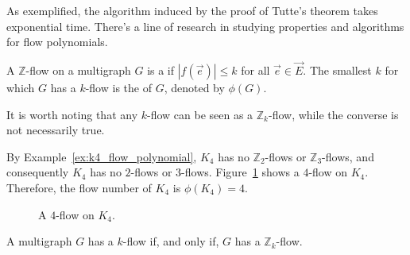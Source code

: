 As exemplified, the algorithm induced by the proof of Tutte's theorem takes exponential time.
There's a line of research in studying properties and algorithms for flow polynomials.

\begin{definition}
	A \(\mathbb{Z}\)-flow on a multigraph \(G\) is a  if \(|f(\vec{e})| \leq k\) for all \(\vec{e} \in \vec{E}\).
	The smallest \(k\) for which \(G\) has a \(k\)-flow is the  of \(G\), denoted by \(\phi(G)\).
\end{definition}

It is worth noting that any \(k\)-flow can be seen as a \(\mathbb{Z}_k\)-flow,
while the converse is not necessarily true.

\begin{example}
	By Example~\ref{ex:k4_flow_polynomial}, \(K_4\) has no \(\mathbb{Z}_2\)-flows or \(\mathbb{Z}_3\)-flows,
	and consequently \(K_4\) has no \(2\)-flows or \(3\)-flows.
	Figure~\ref{fig:k4_4_flow} shows a \(4\)-flow on \(K_4\).
	Therefore, the flow number of \(K_4\) is \(\phi(K_4) = 4\).
\end{example}

\begin{figure}[htbp]
	\centering
	\caption{A \(4\)-flow on \(K_4\).}
	\label{fig:k4_4_flow}
\end{figure}


\begin{theorem}[Tutte (1950)] \label{thm:k-flow-Zk-flow}
	A multigraph \(G\) has a \(k\)-flow if, and only if, \(G\) has a \(\mathbb{Z}_k\)-flow.
\end{theorem}

